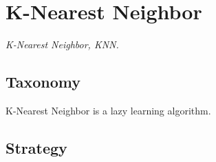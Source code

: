 

\section{K-Nearest Neighbor} 
\label{sec:knn}


\emph{K-Nearest Neighbor, KNN.}

\subsection{Taxonomy}
K-Nearest Neighbor is a lazy learning algorithm.

\subsection{Strategy}


